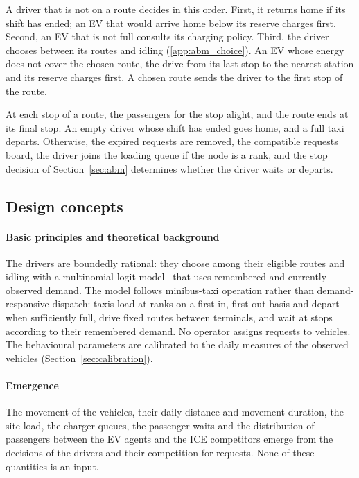 A driver that is not on a route decides in this order. First, it returns home if its shift has ended; an EV that would arrive home below its reserve charges first. Second, an EV that is not full consults its charging policy. Third, the driver chooses between its routes and idling (\ref{app:abm_choice}). An EV whose energy does not cover the chosen route, the drive from its last stop to the nearest station and its reserve charges first. A chosen route sends the driver to the first stop of the route.

At each stop of a route, the passengers for the stop alight, and the route ends at its final stop. An empty driver whose shift has ended goes home, and a full taxi departs. Otherwise, the expired requests are removed, the compatible requests board, the driver joins the loading queue if the node is a rank, and the stop decision of Section~\ref{sec:abm} determines whether the driver waits or departs.

\subsection{Design concepts}
\label{app:abm_concepts}

\paragraph{Basic principles and theoretical background} The drivers are boundedly rational: they choose among their eligible routes and idling with a multinomial logit model~\cite{mcfadden1974_mnl} that uses remembered and currently observed demand. The model follows minibus-taxi operation rather than demand-responsive dispatch: taxis load at ranks on a first-in, first-out basis and depart when sufficiently full, drive fixed routes between terminals, and wait at stops according to their remembered demand. No operator assigns requests to vehicles. The behavioural parameters are calibrated to the daily measures of the observed vehicles (Section~\ref{sec:calibration}).

\paragraph{Emergence} The movement of the vehicles, their daily distance and movement duration, the site load, the charger queues, the passenger waits and the distribution of passengers between the EV agents and the ICE competitors emerge from the decisions of the drivers and their competition for requests. None of these quantities is an input.

